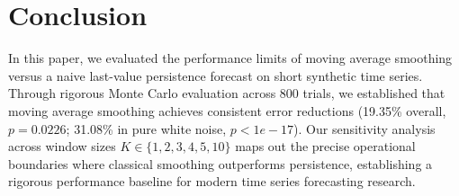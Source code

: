 \documentclass[11pt,letterpaper]{article}
\begin{document}
\section{Conclusion}

In this paper, we evaluated the performance limits of moving average smoothing versus a naive last-value persistence forecast on short synthetic time series. Through rigorous Monte Carlo evaluation across 800 trials, we established that moving average smoothing achieves consistent error reductions (19.35\% overall, $p = 0.0226$; 31.08\% in pure white noise, $p < 1e-17$). Our sensitivity analysis across window sizes $K \in \{1, 2, 3, 4, 5, 10\}$ maps out the precise operational boundaries where classical smoothing outperforms persistence, establishing a rigorous performance baseline for modern time series forecasting research.



\end{document}
